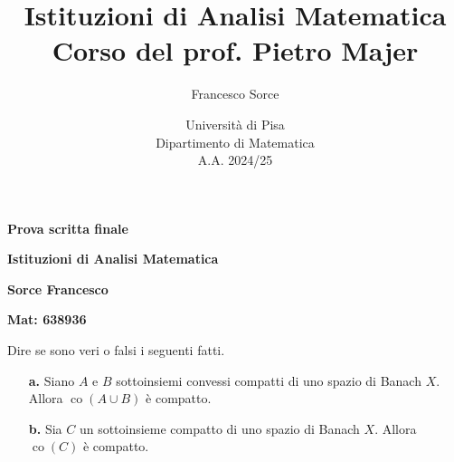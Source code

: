 \documentclass[a4paper]{article}
\title{Istituzioni di Analisi Matematica\\
\large Corso del prof. Pietro Majer}
\author{Francesco Sorce}
\date{Università di Pisa\\
Dipartimento di Matematica\\
A.A. 2024/25}
\DeclareMathOperator{\co}{co}
\begin{document}
\begin{center}
    {\Huge \bf Prova scritta finale}
    \medskip

    {\huge \bf Istituzioni di Analisi Matematica}
    \bigskip

    \bigskip

    {\Huge \bf Sorce Francesco}
    \medskip

    {\huge \bf Mat: 638936}

    \bigskip
    \bigskip
\end{center}



\begin{exercise}
Dire se sono veri o falsi i seguenti fatti.
\begin{enumerate}
    \item[\textbf{a.}] Siano $A$ e $B$ sottoinsiemi convessi compatti di uno spazio di Banach $X$. Allora $\co(A\cup B)$ \`e compatto.
    \item[\textbf{b.}] Sia $C$ un sottoinsieme compatto di uno spazio di Banach $X$. Allora $\co(C)$ \`e compatto. 
\end{enumerate}
\end{exercise}
\end{document}
